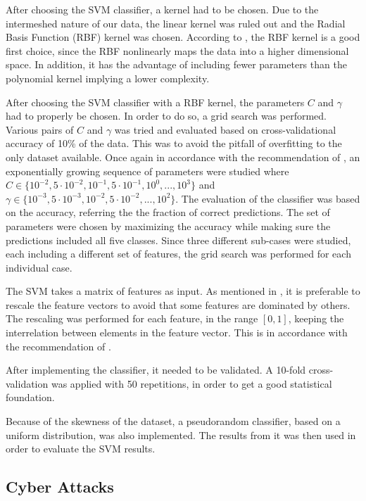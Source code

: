 After choosing the SVM classifier, a kernel had to be chosen. Due to the intermeshed nature of our data, the linear kernel was ruled out and the Radial Basis Function (RBF) kernel was chosen. According to \citet{Hsu10apractical}, the RBF kernel is a good first choice, since the RBF nonlinearly maps the data into a higher dimensional space. In addition, it has the advantage of including fewer parameters than the polynomial kernel implying a lower complexity.

After choosing the SVM classifier with a RBF kernel, the parameters $C$ and $\gamma$ had to properly be chosen. In order to do so, a grid search was performed. Various pairs of $C$ and $\gamma$ was tried and evaluated based on cross-validational accuracy of 10\% of the data. This was to avoid the pitfall of overfitting to the only dataset available. Once again in accordance with the recommendation of \citet{Hsu10apractical}, an exponentially growing sequence of parameters were studied where $C\in\{10^{-2},5\cdot10^{-2},10^{-1},5\cdot10^{-1},10^{0},...,10^{3}\}$ and $\gamma\in\{10^{-3},5\cdot10^{-3},10^{-2},5\cdot10^{-2},...,10^{2}\}$. The evaluation of the classifier was based on the accuracy, referring the the fraction of correct predictions. The set of parameters were chosen by maximizing the accuracy while making sure the predictions included all five classes. Since three different sub-cases were studied, each including a different set of features, the grid search was performed for each individual case. 

The SVM takes a matrix of features as input. As mentioned in , it is preferable to rescale the feature vectors to avoid that some features are dominated by others. The rescaling was performed for each feature, in the range $[0,1]$, keeping the interrelation between elements in the feature vector. This is in accordance with the recommendation of \citet{Hsu10apractical}.

After implementing the classifier, it needed to be validated. A 10-fold cross-validation was applied with 50 repetitions, in order to get a good statistical foundation.

Because of the skewness of the dataset, a pseudorandom classifier, based on a uniform distribution, was also implemented.  The results from it was then used in order to evaluate the SVM results. 

\subsection{Cyber Attacks}\label{cyberattacks}



\newpage 
